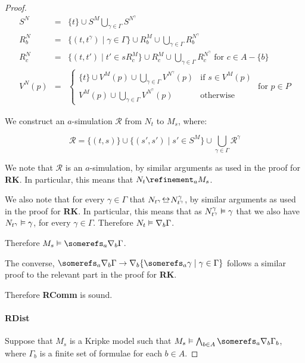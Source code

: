 \begin{proof}
\begin{eqnarray*}
S^N &=& \{t\} \cup S^M \bigcup_{\gamma \in \Gamma} S^{N^\gamma}\\
R^N_b &=& \{(t, t^\gamma) \mid \gamma \in \Gamma\} 
\cup  R^M_b 
\cup \bigcup_{\gamma \in \Gamma} R^{N^\gamma}_b\\
R^N_c &=& \{(t, t') \mid t' \in sR^M_c\} 
\cup R^M_c \cup \bigcup_{\gamma \in \Gamma} R^{N^\gamma}_c \text{ for $c \in A - \{b\}$}\\
V^N(p) &=& 
\begin{cases}
\{t\} \cup V^M(p) \cup \bigcup_{\gamma \in \Gamma} V^{N^\gamma}(p) & \text{if $s
\in V^M(p)$}\\
V^M(p) \cup \bigcup_{\gamma \in \Gamma} V^{N^\gamma}(p) & \text{otherwise}
\end{cases}
\text{ for $p \in P$}
\end{eqnarray*}

We construct an $a$-simulation $\mathcal{R}$ from $N_t$ to $M_s$, where:

$$\mathcal{R} = \{(t, s)\} \cup \{(s', s') \mid s' \in S^M\} \cup
\bigcup_{\gamma \in \Gamma} \mathcal{R}^\gamma$$

We note that $\mathcal{R}$ is an $a$-simulation, by similar arguments as used in
the proof for {\bf RK}. In particular, this means that $N_t \refinement_a M_s$.

We also note that for every $\gamma \in \Gamma$ that $N_{t^\gamma} \bisim
N^\gamma_{t^\gamma}$, by similar arguments as used in the proof for {\bf RK}.
In particular, this means that as $N^\gamma_{t^\gamma} \vDash \gamma$ that we
also have $N_{t^\gamma} \vDash \gamma$, for every $\gamma \in \Gamma$.
Therefore $N_t \vDash \nabla_b \Gamma$.

Therefore $M_s \entails \somerefs_a \covers_b \Gamma$.

The converse, $\somerefs_a \covers_b \Gamma \implies \covers_b \{\somerefs_a
\gamma \mid \gamma \in \Gamma\}$ follows a similar proof to the relevant part in
the proof for {\bf RK}.

Therefore {\bf RComm} is sound.

\paragraph{RDist}
Suppose that $M_s$ is a Kripke model such that $M_s \entails \bigwedge_{b \in A}
\somerefs_a \covers_b \Gamma_b$, where $\Gamma_b$ is a finite set of formulae
for each $b \in A$.


\end{proof}
